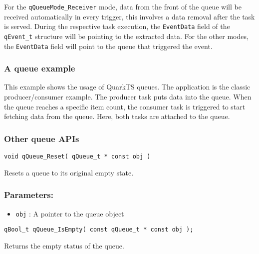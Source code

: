 \begin{tcolorbox}
\HandRight For the \lstinline{qQueueMode_Receiver} mode,  data from the front of the queue will be received automatically in every trigger, this involves a data removal after the task is served. During the respective task execution, the \lstinline{EventData} field of the \lstinline{qEvent_t} structure will be pointing to the extracted data. For the other modes, the \lstinline{EventData} field will point to the queue that triggered the event.
\end{tcolorbox}
    
\subsubsection{A queue example}
This example shows the usage of QuarkTS queues. The application is the classic producer/consumer example. The producer task puts data into the queue. When the queue reaches a specific item count, the consumer task is triggered to start fetching data from the queue. Here, both tasks are attached to the queue. 
\medskip



\subsubsection{Other queue APIs}

\begin{lstlisting}[style=CStyle]
void qQueue_Reset( qQueue_t * const obj )
\end{lstlisting}

Resets a queue to its original empty state. 

\subsubsection*{Parameters:}
\begin{itemize}
    \item \lstinline{obj} : A pointer to the queue object
\end{itemize}

\noindent\hrulefill


\begin{lstlisting}[style=CStyle]
qBool_t qQueue_IsEmpty( const qQueue_t * const obj );
\end{lstlisting}

Returns the empty status of the queue. 

